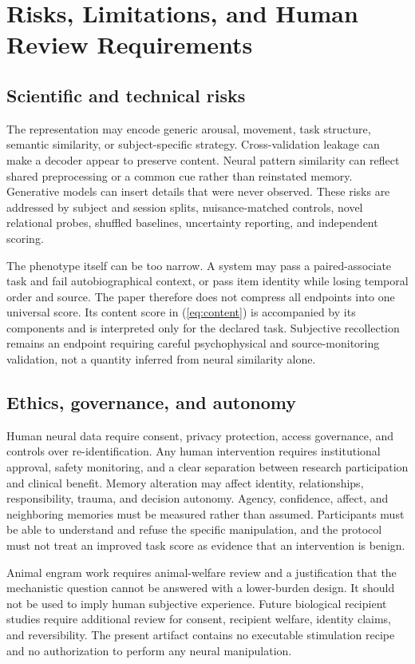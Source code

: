 \documentclass[conference]{IEEEtran}
\begin{document}
\section{Risks, Limitations, and Human Review Requirements}
\subsection{Scientific and technical risks}
The representation may encode generic arousal, movement, task structure, semantic similarity, or subject-specific strategy. Cross-validation leakage can make a decoder appear to preserve content. Neural pattern similarity can reflect shared preprocessing or a common cue rather than reinstated memory. Generative models can insert details that were never observed. These risks are addressed by subject and session splits, nuisance-matched controls, novel relational probes, shuffled baselines, uncertainty reporting, and independent scoring.

The phenotype itself can be too narrow. A system may pass a paired-associate task and fail autobiographical context, or pass item identity while losing temporal order and source. The paper therefore does not compress all endpoints into one universal score. Its content score in (\ref{eq:content}) is accompanied by its components and is interpreted only for the declared task. Subjective recollection remains an endpoint requiring careful psychophysical and source-monitoring validation, not a quantity inferred from neural similarity alone.

\subsection{Ethics, governance, and autonomy}
Human neural data require consent, privacy protection, access governance, and controls over re-identification. Any human intervention requires institutional approval, safety monitoring, and a clear separation between research participation and clinical benefit. Memory alteration may affect identity, relationships, responsibility, trauma, and decision autonomy. Agency, confidence, affect, and neighboring memories must be measured rather than assumed. Participants must be able to understand and refuse the specific manipulation, and the protocol must not treat an improved task score as evidence that an intervention is benign.

Animal engram work requires animal-welfare review and a justification that the mechanistic question cannot be answered with a lower-burden design. It should not be used to imply human subjective experience. Future biological recipient studies require additional review for consent, recipient welfare, identity claims, and reversibility. The present artifact contains no executable stimulation recipe and no authorization to perform any neural manipulation.
\end{document}
